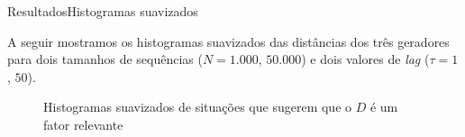 \documentclass[10pt,xcolor={dvipsnames}]{beamer}
\begin{document}
\begin{frame}{Resultados}{Histogramas suavizados}
\begin{block}{}
	A seguir mostramos os histogramas suavizados das distâncias dos três geradores para dois tamanhos de sequências ($N=1.000$, $50.000$) e dois valores de \textit{lag} ($\tau=1$, $50$).
	\begin{figure} %
		\centering
		\caption{Histogramas suavizados de situações que sugerem que o $D$ é um fator relevante}\label{fig:DRelevante}
	\end{figure}
\end{block}
\end{frame}
\end{document}
